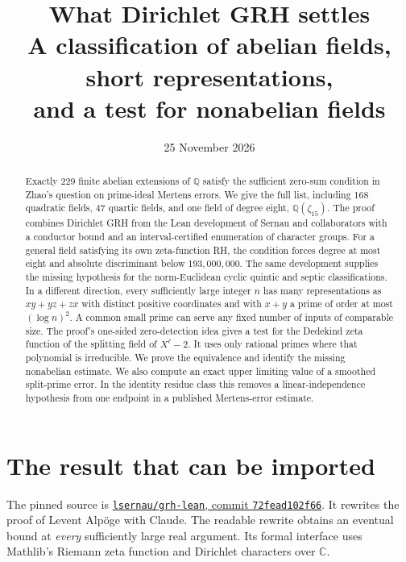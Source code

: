 \documentclass[11pt]{article}
\title{\color{ink}\bfseries What Dirichlet GRH settles\\[4pt]\large A classification of abelian fields, short representations,\\ and a test for nonabelian fields}
\author{}\date{25 November 2026}
\newcommand{\repo}{https://github.com/lsernau/grh-lean/blob/72fead102f663d5c7a407964a13dc0cf9d977207}
\begin{document}
\maketitle\vspace{-14pt}
\begin{abstract}
Exactly 229 finite abelian extensions of $\mathbb Q$ satisfy the sufficient zero-sum condition in Zhao's question on prime-ideal Mertens errors. We give the full list, including 168 quadratic fields, 47 quartic fields, and one field of degree eight, $\mathbb Q(\zeta_{15})$. The proof combines Dirichlet GRH from the Lean development of Sernau and collaborators with a conductor bound and an interval-certified enumeration of character groups. For a general field satisfying its own zeta-function RH, the condition forces degree at most eight and absolute discriminant below $193{,}000{,}000$. The same development supplies the missing hypothesis for the norm-Euclidean cyclic quintic and septic classifications. In a different direction, every sufficiently large integer $n$ has many representations as $xy+yz+zx$ with distinct positive coordinates and with $x+y$ a prime of order at most $(\log n)^2$. A common small prime can serve any fixed number of inputs of comparable size. The proof's one-sided zero-detection idea gives a test for the Dedekind zeta function of the splitting field of $X^\ell-2$. It uses only rational primes where that polynomial is irreducible. We prove the equivalence and identify the missing nonabelian estimate. We also compute an exact upper limiting value of a smoothed split-prime error. In the identity residue class this removes a linear-independence hypothesis from one endpoint in a published Mertens-error estimate.
\end{abstract}

\section{The result that can be imported}
The pinned source is \href{\repo/README.md}{\texttt{lsernau/grh-lean}, commit \texttt{72fead102f66}}. It rewrites the proof of Levent Alpöge with Claude. The readable rewrite obtains an eventual bound at \emph{every} sufficiently large real argument. Its formal interface uses Mathlib's Riemann zeta function and Dirichlet characters over $\mathbb C$.
\end{document}
